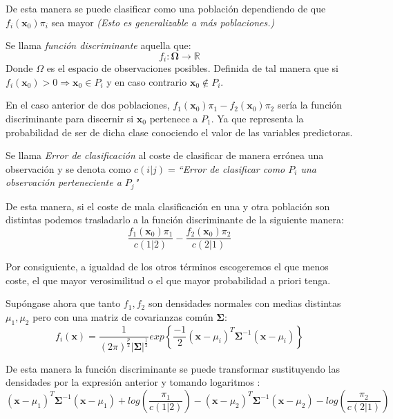 \noindent De esta manera se puede clasificar como una población dependiendo de que $f_i(\textbf{x}_0)\pi_i$ sea mayor \emph{(Esto es generalizable a más poblaciones.)}

\begin{defi}
Se llama \textit{función discriminante } aquella que:
\begin{equation}
f_i:\mathbf{\Omega}\longrightarrow \mathbb{R}
\end{equation}
Donde $\Omega$ es el espacio de observaciones posibles. Definida de tal manera que si $f_i(\textbf{x}_0)>0\Rightarrow \textbf{x}_0\in P_i$ y en caso contrario $\textbf{x}_0\notin P_i$. 
\end{defi}
\noindent En el caso anterior de dos poblaciones, $f_1(\textbf{x}_0)\pi_1-f_2(\textbf{x}_0)\pi_2$ sería la función discriminante para discernir si $\textbf{x}_0$ pertenece a $P_1$. Ya que representa la probabilidad de ser de dicha clase conociendo el valor de las variables predictoras.

\begin{defi}
Se llama \emph{Error de clasificación} al coste de clasificar de manera errónea una observación y se denota como $c(i|j)=$\emph{``Error de clasificar como $P_i$ una observación perteneciente a $P_j$"}
\end{defi}

\noindent De esta manera, si el coste de mala clasificación en una y otra población son distintas podemos trasladarlo a la función discriminante de la siguiente manera:
\begin{equation}
\dfrac{f_1(\textbf{x}_0)\pi_1}{c(1|2)}-\dfrac{f_2(\textbf{x}_0)\pi_2}{c(2|1)}
\end{equation}

\noindent Por consiguiente, a igualdad de los otros términos escogeremos el que menos coste, el que mayor verosimilitud  o el que mayor probabilidad a priori tenga.

\noindent Supóngase ahora que tanto $f_1,f_2$ son densidades normales con medias distintas $\mu_1,\mu_2$ pero con una matriz de covarianzas común $\mathbf{\Sigma}$:
\begin{equation}
f_i(\textbf{x})=\dfrac{1}{(2\pi)^{\frac{p}{2}}|\mathbf{\Sigma}|^{\frac{1}{2}}} exp \left\lbrace\dfrac{-1}{2}(\textbf{x}-\mu_i)^T \mathbf{\Sigma}^{-1}(\textbf{x}-\mu_i) \right\rbrace
\end{equation}

\noindent De esta manera la función discriminante se puede transformar sustituyendo las densidades por la expresión anterior y tomando logaritmos : 
\begin{equation}
(\textbf{x}-\mu_1)^T \mathbf{\Sigma}^{-1}(\textbf{x}-\mu_1)+log\left(\dfrac{\pi_1}{c(1|2)}\right)-(\textbf{x}-\mu_2)^T \mathbf{\Sigma}^{-1} (\textbf{x}-\mu_2)-log\left(\dfrac{\pi_2}{c(2|1)}\right)
\end{equation}

